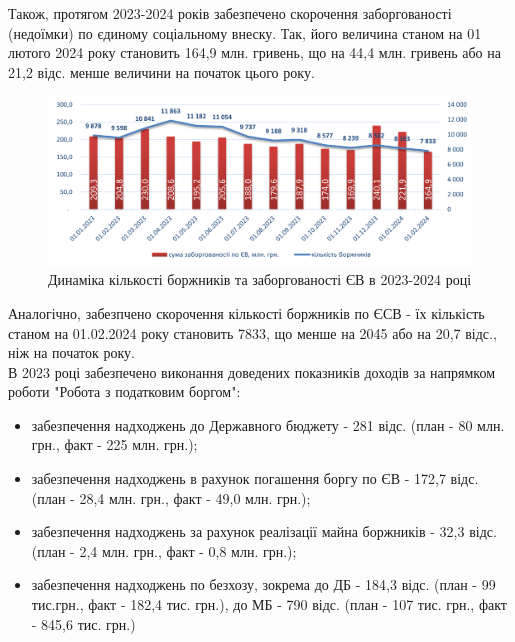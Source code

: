 \documentclass[a4paper,14pt]{article}
\begin{document}
Також, протягом 2023-2024 років забезпечено скорочення заборгованості (недоїмки) по єдиному соціальному внеску. Так, його величина станом на 01 лютого 2024 року становить 164,9 млн. гривень, що на 44,4 млн. гривень або на 21,2 відс. менше величини на початок цього року. \\


\begin{figure}[h]
	\centering
	\includegraphics[width=1\linewidth]{"Динаміка кількості боржників та заборгованості ЄВ"}
	\caption{Динаміка кількості боржників та заборгованості ЄВ в 2023-2024 році}
	\label{fig:-3}
\end{figure}

Аналогічно, забезпчено скорочення кількості боржників по ЄСВ - їх кількість станом на 01.02.2024 року становить 7833, що менше на 2045 або на 20,7 відс., ніж на початок року.\\

В 2023 році забезпечено виконання доведених показників доходів за напрямком роботи  "Робота з податковим боргом":
\begin{itemize}
	\item забезпечення надходжень до Державного бюджету - 281 відс. (план - 80 млн. грн., факт - 225 млн. грн.);
	\item забезпечення надходжень в рахунок погашення боргу по ЄВ - 172,7 відс. (план - 28,4 млн. грн., факт - 49,0 млн. грн.);
	\item забезпечення надходжень за рахунок реалізації майна боржників - 32,3 відс. (план - 2,4 млн. грн., факт - 0,8 млн. грн.);
	\item забезпечення надходжень по безхозу, зокрема до ДБ - 184,3 відс. (план - 99 тис.грн., факт - 182,4 тис. грн.), до МБ - 790 відс. (план - 107 тис. грн., факт - 845,6 тис. грн.) 
\end{itemize} 
\end{document}
